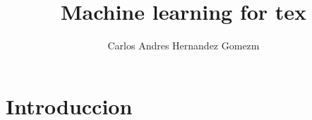 \documentclass{article}
\title{Machine learning for tex}
\author{Carlos Andres Hernandez Gomezm}
\begin{document}
	\maketitle
	
	\newpage
	\tableofcontents
	\newpage

	\section{Introduccion}
\end{document}
